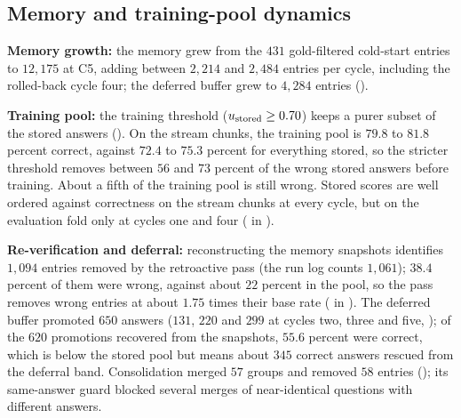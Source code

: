 

\FloatBarrier

\subsection{Memory and training-pool dynamics}
\label{sec:pool-dynamics}

\textbf{Memory growth:} the memory grew from the $431$ gold-filtered cold-start entries to $12{,}175$ at C5, adding between $2{,}214$ and $2{,}484$ entries per cycle, including the rolled-back cycle four; the deferred buffer grew to $4{,}284$ entries ().



\textbf{Training pool:} the training threshold ($u_{\text{stored}} \ge 0.70$) keeps a purer subset of the stored answers (). On the stream chunks, the training pool is $79.8$ to $81.8$ percent correct, against $72.4$ to $75.3$ percent for everything stored, so the stricter threshold removes between $56$ and $73$ percent of the wrong stored answers before training. About a fifth of the training pool is still wrong. Stored scores are well ordered against correctness on the stream chunks at every cycle, but on the evaluation fold only at cycles one and four ( in ).



\textbf{Re-verification and deferral:} reconstructing the memory snapshots identifies $1{,}094$ entries removed by the retroactive pass (the run log counts $1{,}061$); $38.4$ percent of them were wrong, against about $22$ percent in the pool, so the pass removes wrong entries at about $1.75$ times their base rate ( in ). The deferred buffer promoted $650$ answers ($131$, $220$ and $299$ at cycles two, three and five, ); of the $620$ promotions recovered from the snapshots, $55.6$ percent were correct, which is below the stored pool but means about $345$ correct answers rescued from the deferral band. Consolidation merged $57$ groups and removed $58$ entries (); its same-answer guard blocked several merges of near-identical questions with different answers.

\FloatBarrier

